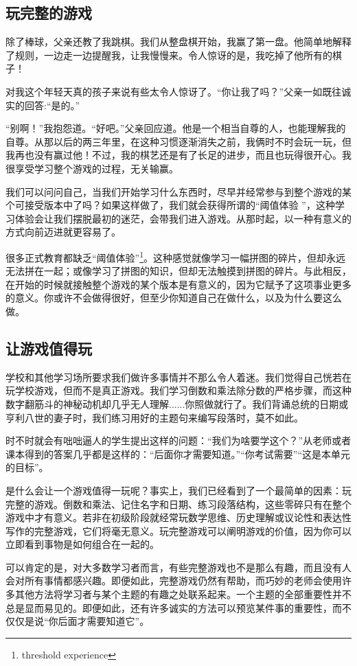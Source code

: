 \subsection*{玩完整的游戏}
除了棒球，父亲还教了我跳棋。我们从整盘棋开始，我赢了第一盘。他简单地解释了规则，一边走一边提醒我，让我慢慢来。令人惊讶的是，我吃掉了他所有的棋子！

对我这个年轻天真的孩子来说有些太令人惊讶了。“你让我了吗？”父亲一如既往诚实的回答:“是的。”

“别啊！”我抱怨道。“好吧。”父亲回应道。他是一个相当自尊的人，也能理解我的自尊。从那以后的两三年里，在这种习惯逐渐消失之前，我俩时不时会玩一玩，但我再也没有赢过他！不过，我的棋艺还是有了长足的进步，而且也玩得很开心。我很享受学习整个游戏的过程，无关输赢。

我们可以问问自己，当我们开始学习什么东西时，尽早并经常参与到整个游戏的某个可接受版本中了吗？如果这样做了，我们就会获得所谓的“阈值体验 ”，这种学习体验会让我们摆脱最初的迷茫，会带我们进入游戏。从那时起，以一种有意义的方式向前迈进就更容易了。

很多正式教育都缺乏“阈值体验”\footnote{threshold experience}。这种感觉就像学习一幅拼图的碎片，但却永远无法拼在一起；或像学习了拼图的知识，但却无法触摸到拼图的碎片。与此相反，在开始的时候就接触整个游戏的某个版本是有意义的，因为它赋予了这项事业更多的意义。你或许不会做得很好，但至少你知道自己在做什么，以及为什么要这么做。

\subsection*{让游戏值得玩}
学校和其他学习场所要求我们做许多事情并不那么令人着迷。我们觉得自己恍若在玩学校游戏，但而不是真正游戏。我们学习倒数和乘法除分数的严格步骤，而这种数字翻筋斗的神秘动机却几乎无人理解......你照做就行了。我们背诵总统的日期或亨利八世的妻子时，我们练习用好的主题句来编写段落时，莫不如此。

时不时就会有咄咄逼人的学生提出这样的问题：“我们为啥要学这个？”从老师或者课本得到的答案几乎都是这样的：“后面你才需要知道。”“你考试需要”“这是本单元的目标”。

是什么会让一个游戏值得一玩呢？事实上，我们已经看到了一个最简单的因素：玩完整的游戏。倒数和乘法、记住名字和日期、练习段落结构，这些零碎只有在整个游戏中才有意义。若非在初级阶段就经常玩数学思维、历史理解或议论性和表达性写作的完整游戏，它们将毫无意义。玩完整游戏可以阐明游戏的价值，因为你可以立即看到事物是如何组合在一起的。

可以肯定的是，对大多数学习者而言，有些完整游戏也不是那么有趣，而且没有人会对所有事情都感兴趣。即便如此，完整游戏仍然有帮助，而巧妙的老师会使用许多其他方法将学习者与某个主题的有趣之处联系起来。一个主题的全部重要性并不总是显而易见的。即便如此，还有许多诚实的方法可以预览某件事的重要性，而不仅仅是说“你后面才需要知道它”。

